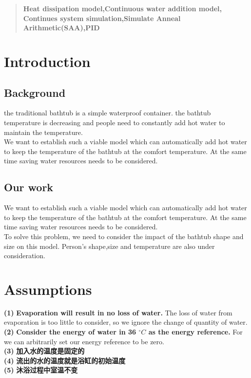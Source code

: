 \documentclass{mcmthesis}
\begin{document}
\begin{abstract}
\begin{keywords}
 \textbf{Heat dissipation model,\indent Continuous water addition model, Continues system simulation,\indent Simulate Anneal Arithmetic(SAA),\indent PID}
\end{keywords}
\end{abstract}

\maketitle
\tableofcontents\thispagestyle{empty}


\setcounter{page}{1}
\section{Introduction}
\subsection{Background}%
\indent the traditional bathtub is a simple waterproof container.
the bathtub temperature is decreasing and people need to constantly add hot water to maintain the temperature.\\
\indent We want to establish such a viable model which can automatically add hot water to keep the temperature of the bathtub at the comfort temperature. At the same time saving water resources needs to be considered.
\subsection{Our work}

\indent We want to establish such a viable model which can automatically add hot water to keep the temperature of the bathtub at the comfort temperature. At the same time saving water resources needs to be considered.\\
\indent To solve this problem, we need to consider the impact of the bathtub shape and size on this model. Person's shape,size and temperature are also under consideration.

\section{Assumptions}
\noindent
{\bf (1) } \textbf{Evaporation will result in no loss of water.} The loss of water from evaporation is too little to consider, so we ignore the change of quantity of water.\\
{\bf (2) } \textbf{Consider the energy of water in 36 ${^\circ}C$ as the energy reference.} For we can arbitrarily set our energy reference to be zero.\\
{\bf (3) } \textbf{加入水的温度是固定的} \\
{\bf (4) } \textbf{流出的水的温度就是浴缸的初始温度} \\
{\bf (5) } \textbf{沐浴过程中室温不变} \\
\end{document}
